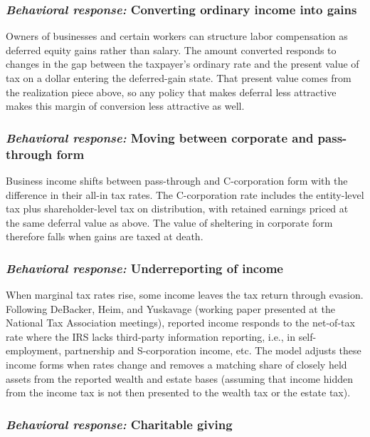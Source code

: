 \documentclass[10pt,twocolumn]{article}
\begin{document}
\subsubsection*{\textit{Behavioral response:} Converting ordinary income into gains}

Owners of businesses and certain workers can structure labor compensation as
deferred equity gains rather than salary. The amount converted responds to
changes in the gap between the taxpayer's ordinary rate and the present value
of tax on a dollar entering the deferred-gain state. That present value comes
from the realization piece above, so any policy that makes deferral less
attractive makes this margin of conversion less attractive as well.

\subsubsection*{\textit{Behavioral response:} Moving between corporate and pass-through form}

Business income shifts between pass-through and C-corporation form with the
difference in their all-in tax rates. The C-corporation rate includes the
entity-level tax plus shareholder-level tax on distribution, with retained
earnings priced at the same deferral value as above. The value of sheltering
in corporate form therefore falls when gains are taxed at death.

\subsubsection*{\textit{Behavioral response:} Underreporting of income}

When marginal tax rates rise, some income leaves the tax return through
evasion. Following DeBacker, Heim, and Yuskavage (working paper presented at the National Tax Association meetings),
reported income responds to the net-of-tax rate where the IRS lacks
third-party information reporting, i.e., in self-employment, partnership and
S-corporation income, etc. The model adjusts these income forms when rates
change and removes a matching share of closely held assets from the reported
wealth and estate bases (assuming that income hidden from the income tax is
not then presented to the wealth tax or the estate tax).

\subsubsection*{\textit{Behavioral response:} Charitable giving}
\end{document}
